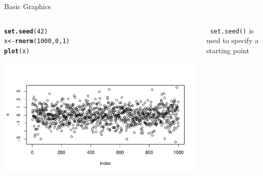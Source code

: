 \documentclass[11pt,german,hideothersubsections]{beamer}\usepackage[]{graphicx}\usepackage[]{color}
\makeatletter
\def\maxwidth{ %
  \ifdim\Gin@nat@width>\linewidth
    \linewidth
  \else
    \Gin@nat@width
  \fi
}
\newcommand{\hlnum}[1]{\textcolor[rgb]{0.686,0.059,0.569}{#1}}%
\newcommand{\hlstd}[1]{\textcolor[rgb]{0.345,0.345,0.345}{#1}}%
\newcommand{\hlkwb}[1]{\textcolor[rgb]{0.69,0.353,0.396}{#1}}%
\newcommand{\hlkwd}[1]{\textcolor[rgb]{0.737,0.353,0.396}{\textbf{#1}}}%
\newenvironment{kframe}{%
 \def\at@end@of@kframe{}%
 \ifinner\ifhmode%
  \def\at@end@of@kframe{\end{minipage}}%
  \begin{minipage}{\columnwidth}%
 \fi\fi%
 \def\FrameCommand##1{\hskip\@totalleftmargin \hskip-\fboxsep
 \colorbox{shadecolor}{##1}\hskip-\fboxsep
     \hskip-\linewidth \hskip-\@totalleftmargin \hskip\columnwidth}%
 \MakeFramed {\advance\hsize-\width
   \@totalleftmargin\z@ \linewidth\hsize
   \@setminipage}}%
 {\par\unskip\endMakeFramed%
 \at@end@of@kframe}
\newenvironment{knitrout}{}{} %
\newcommand{\R}[1]{{\tt \color{blue}  #1}}
\makeatother
\begin{document}
\begin{frame}[fragile]{Basic Graphics}

\begin{columns}
\begin{column}{.5\textwidth}
\begin{knitrout}
\color{fgcolor}\begin{kframe}
\begin{alltt}
\hlkwd{set.seed}\hlstd{(}\hlnum{42}\hlstd{)}
\hlstd{x} \hlkwb{<-} \hlkwd{rnorm}\hlstd{(}\hlnum{1000}\hlstd{,}\hlnum{0}\hlstd{,}\hlnum{1}\hlstd{)}
\hlkwd{plot}\hlstd{(x)}
\end{alltt}
\end{kframe}
\includegraphics[width=\maxwidth]{figure/unnamed-chunk-9-1} 

\end{knitrout}
\end{column}
\vspace{.25cm}
\begin{column}{.5\textwidth}

\R{set.seed()} is used to specify a starting point


\end{column}
\end{columns}
\end{frame}
\end{document}
